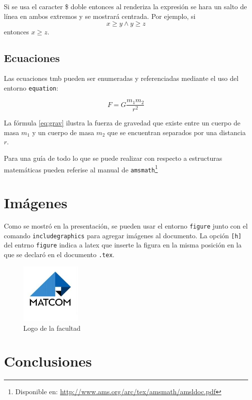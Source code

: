 \documentclass[a4paper,12pt]{article}
\begin{document}
Si se usa el caracter \$ doble entonces al renderiza la expresión se hara un
salto de línea en ambos extremos y se mostrará centrada. Por ejemplo, si $$x \ge
y \wedge y \ge z$$ entonces $x \ge z$.

\subsection{Ecuaciones}\label{sub:eq}

Las ecuaciones tmb pueden ser enumeradas y referenciadas mediante el uso del
entorno \texttt{equation}:

\begin{equation}\label{eq:grav}
    F = G\frac{m_1m_2}{r^2}
\end{equation}

La fórmula \ref{eq:grav} ilustra la fuerza de gravedad que existe entre un
cuerpo de masa $m_1$ y un cuerpo de masa $m_2$ que se encuentran separados por
una distancia $r$.

Para una guía de todo lo que se puede realizar con respecto a estructuras
matemáticas pueden referise al manual de \texttt{amsmath}\footnote{Disponible
en: \url{http://www.ams.org/arc/tex/amsmath/amsldoc.pdf}}

\section{Imágenes}\label{sec:img-and-tables}

Como se mostró en la presentación, se pueden usar el entorno \texttt{figure}
junto con el comando \texttt{includegraphics} para agregar imágenes al
documento.  La opción \texttt{[h]} del entrno \texttt{figure} indica a latex que
inserte la figura en la misma posición en la que se declaró en el documento
\texttt{.tex}.

\begin{figure}[h]
    \center
    \includegraphics[width=3cm]{matcom.jpg}
    \caption{Logo de la facultad}
    \label{fig:logo}
\end{figure}

\section{Conclusiones}\label{sec:concl}
\end{document}
